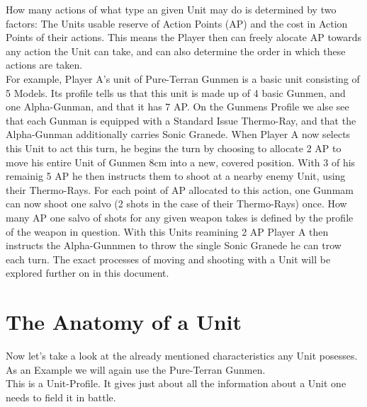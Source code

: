 \documentclass[a4paper,12pt]{book}
\begin{document}
How many actions of what type an given Unit may do is determined by two factors: The Units usable reserve of Action Points (AP) and the cost in Action Points of their actions. This means the Player then can freely alocate AP towards any action the Unit can take, and can also determine the order in which these actions are taken.\\
 For example, Player A's unit of Pure-Terran Gunmen is a basic unit consisting of 5 Models. Its profile tells us that this unit is made up of  4 basic Gunmen, and one Alpha-Gunman, and that it has 7 AP. On the Gunmens Profile we alse see that each Gunman is equipped with a Standard Issue Thermo-Ray, and that the Alpha-Gunman additionally carries Sonic Granede. When Player A now selects this Unit to act this turn, he begins the turn by choosing to allocate 2 AP to move his entire Unit of Gunmen 8cm into a new, covered position. With 3 of his remainig 5 AP he then instructs them to shoot at a nearby enemy Unit, using their Thermo-Rays. For each point of AP allocated to this action, one Gunmam can now shoot one salvo (2 shots in the case of their Thermo-Rays) once. How many AP one salvo of shots for any given weapon takes is defined by the profile of the weapon in question. With this Units reamining 2 AP Player A then instructs the Alpha-Gunnmen to throw the single Sonic Granede he can trow each turn. The exact processes of moving and shooting with a Unit will be explored further on in this document.\\
 \newpage
 \section{The Anatomy of a Unit}
 Now let's take a look at the already mentioned characteristics any Unit posesses. As an Example we will again use the Pure-Terran Gunmen.\\
 This is a Unit-Profile. It gives just about all the information about a Unit one needs to field it in battle.
 
\end{document}
